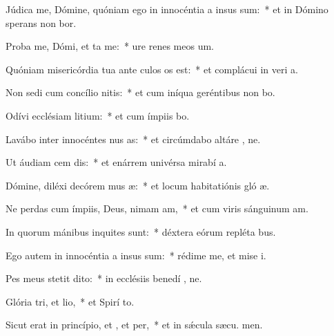 \item Júdica me, Dómine, quóniam ego in innocéntia a insus sum:~* et in Dómino sperans non bor.
\item Proba me, Dómi, et ta me:~* ure renes meos   um.
\item Quóniam misericórdia tua ante culos os est:~* et complácui in veri a.
\item Non sedi cum concílio nitis:~* et cum iníqua geréntibus non bo.
\item Odívi ecclésiam litium:~* et cum ímpiis  bo.
\item Lavábo inter innocéntes nus as:~* et circúmdabo altáre , ne.
\item Ut áudiam cem dis:~* et enárrem univérsa mirabí a.
\item Dómine, diléxi decórem mus æ:~* et locum habitatiónis gló æ.
\item Ne perdas cum ímpiis, Deus, nimam am,~* et cum viris sánguinum  am.
\item In quorum mánibus inquites sunt:~* déxtera eórum repléta  bus.
\item Ego autem in innocéntia a insus sum:~* rédime me, et mise i.
\item Pes meus stetit  dito:~* in ecclésiis benedí , ne.
\item Glória tri, et lio,~* et Spirí to.
\item Sicut erat in princípio, et , et per,~* et in sǽcula sæcu. men.

